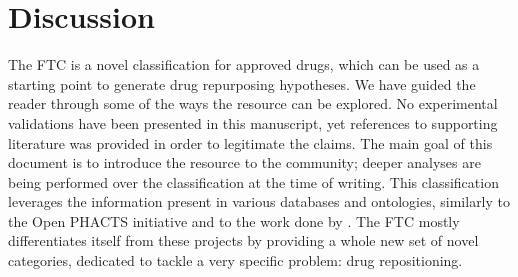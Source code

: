 \documentclass{bioinfo}
\begin{document}
\section{Discussion}

The FTC is a novel classification for approved drugs, which can be used as a starting point to 
generate drug repurposing hypotheses. We have guided the reader through some of the ways the resource 
can be explored. No experimental validations have been presented in this manuscript, yet references to 
supporting literature was provided in order to legitimate the claims. The main goal of this document is to 
introduce the resource to the community; deeper analyses are being performed over the classification at the time of writing.
This classification leverages the information present in various databases and ontologies, similarly to the 
Open PHACTS initiative \citep{williams2012open} and to the work done by \cite{hoehndorf2012identifying}. The FTC
mostly differentiates itself from these projects by providing a whole new set of novel categories, 
dedicated to tackle a very specific problem: drug repositioning.
\end{document}
